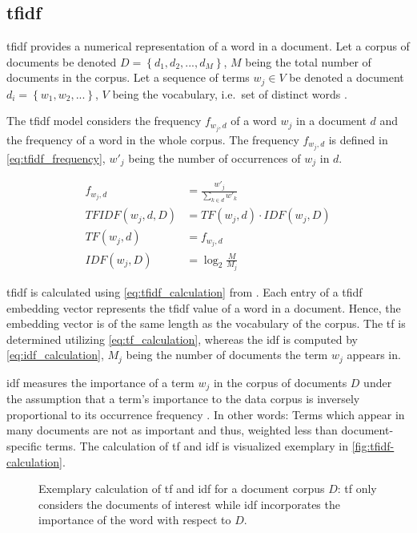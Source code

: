 \subsection{\acl*{tfidf}}\label{subsec:tfidf}

\acf{tfidf} provides a numerical representation of a word in a document.
Let a corpus of documents be denoted $D= \left\{d_1, d_2, ..., d_M  \right\}$, $M$ being the total number of documents in the corpus. 
Let a sequence of terms $w_{j} \in V$ be denoted a document $d_i = \left\{w_{1}, w_{2}, ...\right\}$, 
$V$ being the vocabulary, 
i.e.\ set of distinct words \cite{clusteringDocs2020}.

The \ac{tfidf} model considers the frequency $f_{w_{j}, d}$  of a word $w_{j}$ in a document $d$ and the frequency of a word in the whole corpus. 
The frequency $f_{w_{j}, d}$ is defined in \autoref{eq:tfidf_frequency}, $w'_j$ being the number of occurrences of $w_j$ in $d$.

\begin{align}
    f_{w_{j}, d} &= \frac{w'_{j}}{\sum_{k \in d} w'_k}\label{eq:tfidf_frequency}\\
    TFIDF(w_{j}, d, D) &= TF(w_{j}, d) \cdot IDF(w_{j}, D)\label{eq:tfidf_calculation}\\
    TF(w_{j}, d) &= f_{w_{j}, d}\label{eq:tf_calculation}\\
    IDF(w_{j}, D) &= \log_2\frac{M}{M_{j}}\label{eq:idf_calculation}
\end{align}

\ac{tfidf} is calculated using \autoref{eq:tfidf_calculation} from \cite{clusteringDocs2020}.
Each entry of a \ac{tfidf} embedding vector represents the \ac{tfidf} value of a word in a document.
Hence, the embedding vector is of the same length as the vocabulary of the corpus.
The \ac{tf} is determined utilizing \autoref{eq:tf_calculation}, 
whereas the \ac{idf} is computed by \autoref{eq:idf_calculation}, 
$M_{j}$ being the number of documents the term $w_{j}$ appears in.

\ac{idf} measures the importance of a term $w_{j}$ in the corpus of documents $D$
under the assumption that a term's importance to the data corpus is inversely proportional to its occurrence frequency \cite{tfidf2008}.
In other words: Terms which appear in many documents are not as important and thus, weighted less than document-specific terms. 
The calculation of \ac{tf} and \ac{idf} is visualized exemplary in \autoref{fig:tfidf-calculation}.


\begin{figure}[!htb] %
    \centering
    
    \caption[Exemplary calculation of \acs*{tf} and \acs*{idf} values]{
        Exemplary calculation of \acs*{tf} and \acs*{idf} for a document corpus $D$: 
        \acs*{tf} only considers the documents of interest while 
        \acs*{idf} incorporates the importance of the word with respect to $D$.
    }
    \label{fig:tfidf-calculation}
\end{figure}

